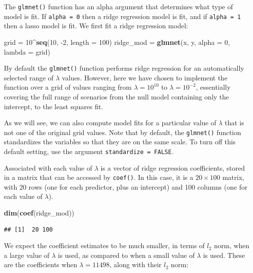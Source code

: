 \documentclass[
  openany]{book}
\newenvironment{Shaded}{\begin{snugshade}}{\end{snugshade}}
\newcommand{\DataTypeTok}[1]{\textcolor[rgb]{0.13,0.29,0.53}{#1}}
\newcommand{\DecValTok}[1]{\textcolor[rgb]{0.00,0.00,0.81}{#1}}
\newcommand{\KeywordTok}[1]{\textcolor[rgb]{0.13,0.29,0.53}{\textbf{#1}}}
\newcommand{\NormalTok}[1]{#1}
\newcommand{\OperatorTok}[1]{\textcolor[rgb]{0.81,0.36,0.00}{\textbf{#1}}}
\newcommand{\StringTok}[1]{\textcolor[rgb]{0.31,0.60,0.02}{#1}}
\begin{document}
The \texttt{glmnet()} function has an alpha argument that determines what type
of model is fit. If \texttt{alpha\ =\ 0} then a ridge regression model is fit, and if \texttt{alpha\ =\ 1}
then a lasso model is fit. We first fit a ridge regression model:

\begin{Shaded}
\begin{Highlighting}[]
\NormalTok{grid =}\StringTok{ }\DecValTok{10}\OperatorTok{^}\KeywordTok{seq}\NormalTok{(}\DecValTok{10}\NormalTok{, }\DecValTok{-2}\NormalTok{, }\DataTypeTok{length =} \DecValTok{100}\NormalTok{)}
\NormalTok{ridge_mod =}\StringTok{ }\KeywordTok{glmnet}\NormalTok{(x, y, }\DataTypeTok{alpha =} \DecValTok{0}\NormalTok{, }\DataTypeTok{lambda =}\NormalTok{ grid)}
\end{Highlighting}
\end{Shaded}

By default the \texttt{glmnet()} function performs ridge regression for an automatically
selected range of \(\lambda\) values. However, here we have chosen to implement
the function over a grid of values ranging from \(\lambda = 10^10\) to \(\lambda = 10^{-2}\), essentially covering the full range of scenarios from the null model containing
only the intercept, to the least squares fit.

As we will see, we can also compute
model fits for a particular value of \(\lambda\) that is not one of the original
grid values. Note that by default, the \texttt{glmnet()} function standardizes the
variables so that they are on the same scale. To turn off this default setting,
use the argument \texttt{standardize\ =\ FALSE}.

Associated with each value of \(\lambda\) is a vector of ridge regression coefficients,
stored in a matrix that can be accessed by \texttt{coef()}. In this case, it is a \(20 \times 100\)
matrix, with 20 rows (one for each predictor, plus an intercept) and 100
columns (one for each value of \(\lambda\)).

\begin{Shaded}
\begin{Highlighting}[]
\KeywordTok{dim}\NormalTok{(}\KeywordTok{coef}\NormalTok{(ridge_mod))}
\end{Highlighting}
\end{Shaded}

\begin{verbatim}
## [1]  20 100
\end{verbatim}

We expect the coefficient estimates to be much smaller, in terms of \(l_2\) norm,
when a large value of \(\lambda\) is used, as compared to when a small value of \(\lambda\) is
used. These are the coefficients when \(\lambda = 11498\), along with their \(l_2\) norm:
\end{document}
